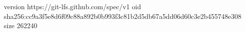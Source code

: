 version https://git-lfs.github.com/spec/v1
oid sha256:cc9a3f5e8d6f09c88a892b0b993f3c81b2d5db67a5dd06d60c3e2b455748e308
size 262240
